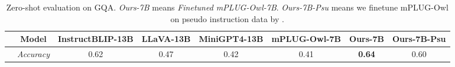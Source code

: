 
\begin{table}[t]
\setlength\tabcolsep{3pt}
\centering
\small
\begin{tabular}{lccccc|cc}
\toprule[1.5pt]
& Model& InstructBLIP-13B & LLaVA-13B & MiniGPT4-13B & mPLUG-Owl-7B &\textbf{Ours-7B}& Ours-7B-Psu \\
\midrule
&\textit{Accuracy} & 0.62 & 0.47 & 0.42 & 0.41 & \textbf{0.64}& 0.60\\
\bottomrule[1.5pt]
\end{tabular}
\vspace{2mm}
\caption{
Zero-shot evaluation on GQA. \textit{Ours-7B} means \textit{Finetuned mPLUG-Owl-7B}. \textit{Ours-7B-Psu} means we finetune mPLUG-Owl on pseudo instruction data by \citep{wu2022grit}.}
\label{tab:GQA}
\vspace{-0.2in}
\end{table}


















